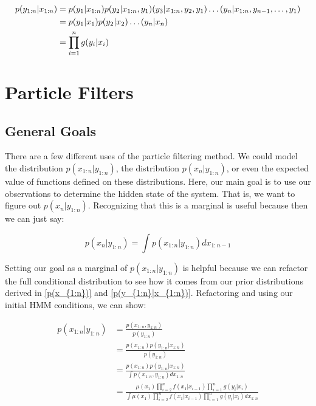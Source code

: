 \documentclass{article}
\begin{document}
\begin{equation} \label{p(y_{1:n}|x_{1:n})}
\begin{split}
p(y_{1:n}|x_{1:n})
&= p(y_1|x_{1:n})p(y_2|x_{1:n},y_1)(y_3|x_{1:n},y_2,y_1)\dots (y_n|x_{1:n},y_{n-1},\dots,y_1)\\
&= p(y_1|x_1)p(y_2|x_2)\dots (y_n|x_n)\\
&= \prod_{i=1}^{n} g(y_i|x_i)\\
\end{split}
\end{equation}


\section{Particle Filters}
\subsection{General Goals}
There are a few different uses of the particle filtering method. We could model the distribution $p(x_{1:n}|y_{1:n})$, the distribution $p(x_n|y_{1:n})$, or even the expected value of functions defined on these distributions. Here, our main goal is to use our observations to determine the hidden state of the system. That is, we want to figure out $p(x_{n}|y_{1:n})$. Recognizing that this is a marginal is useful because then we can just say:

\begin{equation}
p(x_{n}|y_{1:n}) = \int p(x_{1:n}|y_{1:n}) dx_{1:n-1}
\end{equation}

Setting our goal as a marginal of $p(x_{1:n}|y_{1:n})$ is helpful because we can refactor the full conditional distribution to see how it comes from our prior distributions derived in \eqref{p(x_{1:n})} and \eqref{p(y_{1:n}|x_{1:n})}. Refactoring and using our initial HMM conditions, we can show:

\begin{equation}
\begin{split}
p(x_{1:n}|y_{1:n}) &= \frac{p(x_{1:n},y_{1:n})}{p(y_{1:n})}\\
&= \frac{p(x_{1:n}) p(y_{1:n}|x_{1:n})}{p(y_{1:n})}\\
&= \frac{p(x_{1:n}) p(y_{1:n}|x_{1:n})}{\int p(x_{1:n},y_{1:n}) dx_{1:n}}\\
&= \frac{\mu(x_1)\prod_{i=2}^{n} f(x_1|x_{i-1})\prod_{i=1}^{n} g(y_i|x_i)}{\int \mu(x_1)\prod_{i=2}^{n} f(x_1|x_{i-1})\prod_{i=1}^{n} g(y_i|x_i) dx_{1:n}}
\end{split}
\end{equation}
\end{document}
